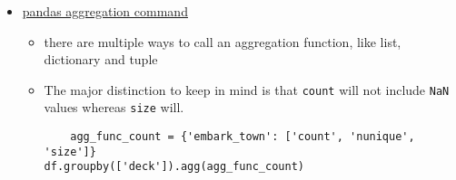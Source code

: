 \documentclass{article}
\begin{document}
\begin{itemize}
\begin{itemize}
		\item 
	\end{itemize}
\item \href{https://pbpython.com/groupby-agg.html}{pandas aggregation command}
	\begin{itemize}
		\item there are multiple ways to call an aggregation function, like list, dictionary and tuple
		\item The major distinction to keep in mind is that \texttt{count} will not include \texttt{NaN} values whereas \texttt{size} will. 
	\begin{verbatim}
	agg_func_count = {'embark_town': ['count', 'nunique', 'size']}
df.groupby(['deck']).agg(agg_func_count)
	\end{verbatim}
	\end{itemize}


\end{itemize}
\end{document}
